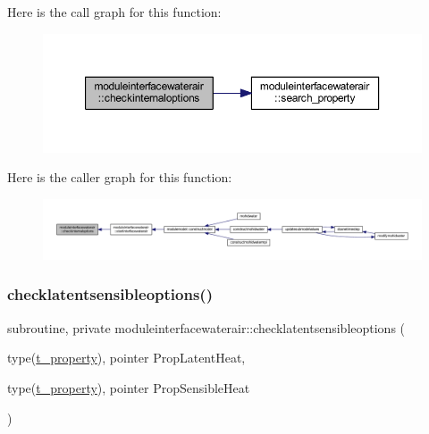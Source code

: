 Here is the call graph for this function\+:\nopagebreak
\begin{figure}[H]
\begin{center}
\leavevmode
\includegraphics[width=350pt]{namespacemoduleinterfacewaterair_a7bb7aa6672e098e262e702265ea4cbef_cgraph}
\end{center}
\end{figure}
Here is the caller graph for this function\+:\nopagebreak
\begin{figure}[H]
\begin{center}
\leavevmode
\includegraphics[width=350pt]{namespacemoduleinterfacewaterair_a7bb7aa6672e098e262e702265ea4cbef_icgraph}
\end{center}
\end{figure}
\mbox{\label{namespacemoduleinterfacewaterair_a7ad682cf919390b70351f87d094eb4fb}} 
\subsubsection{\texorpdfstring{checklatentsensibleoptions()}{checklatentsensibleoptions()}}
{\footnotesize\ttfamily subroutine, private moduleinterfacewaterair\+::checklatentsensibleoptions (\begin{DoxyParamCaption}\item[{type(\mbox{\hyperlink{structmoduleinterfacewaterair_1_1t__property}{t\+\_\+property}}), pointer}]{Prop\+Latent\+Heat,  }\item[{type(\mbox{\hyperlink{structmoduleinterfacewaterair_1_1t__property}{t\+\_\+property}}), pointer}]{Prop\+Sensible\+Heat }\end{DoxyParamCaption})\hspace{0.3cm}{\ttfamily [private]}}

